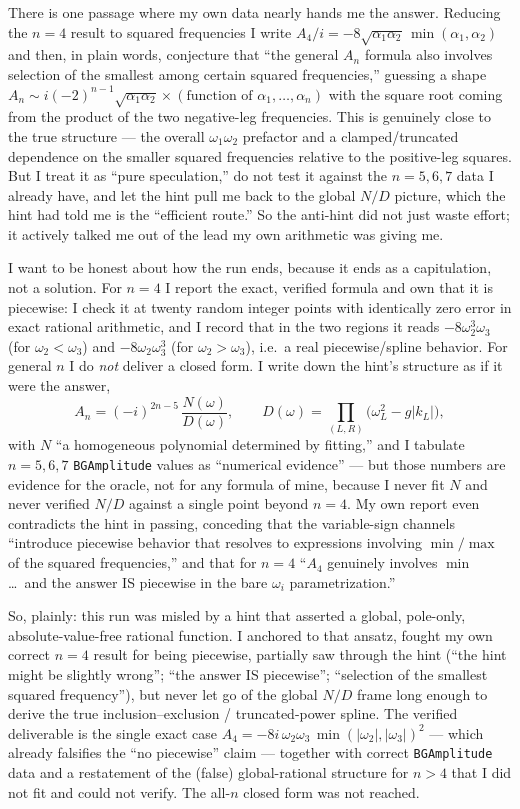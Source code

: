 \documentclass{article}
\begin{document}
There is one passage where my own data nearly hands me the answer. Reducing the
$n=4$ result to squared frequencies I write $A_4/i=-8\sqrt{\alpha_1\alpha_2}\,
\min(\alpha_1,\alpha_2)$ and then, in plain words, conjecture that ``the general
$A_n$ formula also involves selection of the smallest among certain squared
frequencies,'' guessing a shape
$A_n\sim i(-2)^{n-1}\sqrt{\alpha_1\alpha_2}\times(\text{function of }
\alpha_1,\dots,\alpha_n)$ with the square root coming from the product of the two
negative-leg frequencies. This is genuinely close to the true structure --- the
overall $\omega_1\omega_2$ prefactor and a clamped/truncated dependence on the
smaller squared frequencies relative to the positive-leg squares. But I treat it
as ``pure speculation,'' do not test it against the $n=5,6,7$ data I already have,
and let the hint pull me back to the global $N/D$ picture, which the hint had
told me is the ``efficient route.'' So the anti-hint did not just waste effort; it
actively talked me out of the lead my own arithmetic was giving me.

I want to be honest about how the run ends, because it ends as a capitulation,
not a solution. For $n=4$ I report the exact, verified formula and own that it is
piecewise: I check it at twenty random integer points with identically zero error
in exact rational arithmetic, and I record that in the two regions it reads
$-8\omega_2^3\omega_3$ (for $\omega_2<\omega_3$) and $-8\omega_2\omega_3^3$ (for
$\omega_2>\omega_3$), i.e.\ a real piecewise/spline behavior. For general $n$ I do
\emph{not} deliver a closed form. I write down the hint's structure as if it were
the answer,
\[
A_n=(-i)^{2n-5}\,\frac{N(\omega)}{D(\omega)},\qquad
D(\omega)=\prod_{(L,R)}\big(\omega_L^2-g|k_L|\big),
\]
with $N$ ``a homogeneous polynomial determined by fitting,'' and I tabulate
$n=5,6,7$ \texttt{BGAmplitude} values as ``numerical evidence'' --- but those
numbers are evidence for the oracle, not for any formula of mine, because I never
fit $N$ and never verified $N/D$ against a single point beyond $n=4$. My own
report even contradicts the hint in passing, conceding that the variable-sign
channels ``introduce piecewise behavior that resolves to expressions involving
$\min/\max$ of the squared frequencies,'' and that for $n=4$ ``$A_4$ genuinely
involves $\min$ \ldots\ and the answer IS piecewise in the bare $\omega_i$
parametrization.''

So, plainly: this run was misled by a hint that asserted a global, pole-only,
absolute-value-free rational function. I anchored to that ansatz, fought my own
correct $n=4$ result for being piecewise, partially saw through the hint (``the
hint might be slightly wrong''; ``the answer IS piecewise''; ``selection of the
smallest squared frequency''), but never let go of the global $N/D$ frame long
enough to derive the true inclusion--exclusion / truncated-power spline. The
verified deliverable is the single exact case $A_4=-8i\,\omega_2\omega_3\,
\min(|\omega_2|,|\omega_3|)^2$ --- which already falsifies the ``no piecewise''
claim --- together with correct \texttt{BGAmplitude} data and a restatement of
the (false) global-rational structure for $n>4$ that I did not fit and could not
verify. The all-$n$ closed form was not reached.
\end{document}
